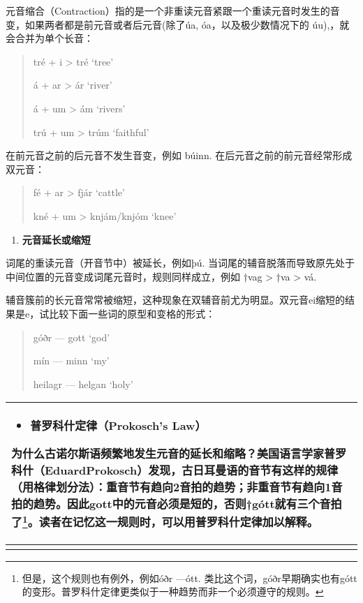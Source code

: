 元音缩合（Contraction）指的是一个非重读元音紧跟一个重读元音时发生的音变，如果两者都是前元音或者后元音(除了úa,
óa，以及极少数情况下的 úu),，就会合并为单个长音：

\begin{quote}
  tré + i \textgreater{} tré `tree'

  á + ar \textgreater{} ár `river'

  á + um \textgreater{} ám `rivers'

  trú + um \textgreater{} trúm `faithful'
\end{quote}

在前元音之前的后元音不发生音变，例如 búinn.
在后元音之前的前元音经常形成双元音：

\begin{quote}
  fé + ar \textgreater{} fjár `cattle'

  kné + um \textgreater{} knjám/knjóm `knee'
\end{quote}

\begin{enumerate}
  \def\labelenumi{\Alph{enumi}.}
  \setcounter{enumi}{2}
  \item
        \textbf{元音延长或缩短}
\end{enumerate}

词尾的重读元音（开音节中）被延长，例如þú.
当词尾的辅音脱落而导致原先处于中间位置的元音变成词尾元音时，规则同样成立，例如
†vag \textgreater{} †va \textgreater{} vá.

辅音簇前的长元音常常被缩短，这种现象在双辅音前尤为明显。双元音ei缩短的结果是e，试比较下面一些词的原型和变格的形式：

\begin{quote}
  góðr --- gott `god'

  mín --- minn `my'

  heilagr --- helgan `holy'
\end{quote}

\begin{longtable}{l}
  \toprule
  \begin{itemize}\item  \textbf{普罗科什定律（Prokosch's Law）}\end{itemize}为什么古诺尔斯语频繁地发生元音的延长和缩略？美国语言学家普罗科什（EduardProkosch）发现，古日耳曼语的音节有这样的规律（用格律划分法）：\textbf{重音节有趋向2音拍的趋势；非重音节有趋向1音拍的趋势。}因此gott中的元音必须是短的，否则†gótt就有三个音拍了\footnote{但是，这个规则也有例外，例如óðr  ---ótt.  类比这个词，góðr早期确实也有gótt的变形。普罗科什定律更类似于一种趋势而非一个必须遵守的规则。}。读者在记忆这一规则时，可以用普罗科什定律加以解释。 \\
  \midrule
  \endhead
  \bottomrule
  \endfoot
\end{longtable}


